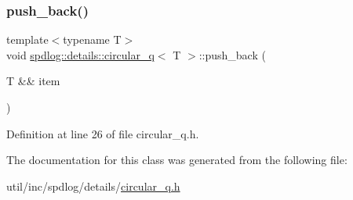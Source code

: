\subsubsection{\texorpdfstring{push\+\_\+back()}{push\_back()}}
{\footnotesize\ttfamily template$<$typename T$>$ \\
void \hyperlink{classspdlog_1_1details_1_1circular__q}{spdlog\+::details\+::circular\+\_\+q}$<$ T $>$\+::push\+\_\+back (\begin{DoxyParamCaption}\item[{T \&\&}]{item }\end{DoxyParamCaption})\hspace{0.3cm}{\ttfamily [inline]}}



Definition at line 26 of file circular\+\_\+q.\+h.



The documentation for this class was generated from the following file\+:\begin{DoxyCompactItemize}
\item 
util/inc/spdlog/details/\hyperlink{circular__q_8h}{circular\+\_\+q.\+h}\end{DoxyCompactItemize}
